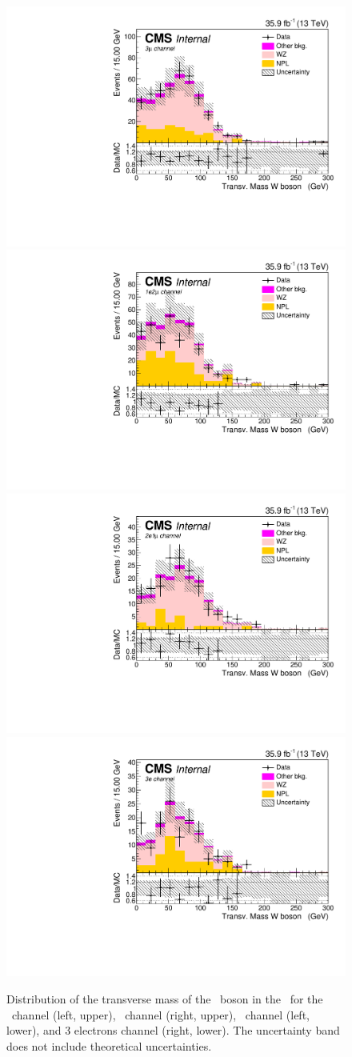 \begin{figure}[htbp]
	\centering
	\includegraphics[width=0.49\linewidth]{6_Search/Figures/InitialFit/wzcontrol_MVA_mWt_uuu_Stack}
	\includegraphics[width=0.49\linewidth]{6_Search/Figures/InitialFit/wzcontrol_MVA_mWt_uue_Stack}
	\includegraphics[width=0.49\linewidth]{6_Search/Figures/InitialFit/wzcontrol_MVA_mWt_eeu_Stack}
	\includegraphics[width=0.49\linewidth]{6_Search/Figures/InitialFit/wzcontrol_MVA_mWt_eee_Stack}
	\caption{Distribution of the transverse mass of the \PW\ boson in the \WZCR\ for the \mumumu\ channel (left, upper), \emumu\ channel (right, upper), \eemu\ channel (left, lower), and 3 electrons channel (right, lower). The uncertainty band does not include theoretical uncertainties.}
	\label{fig:mtwstack}
\end{figure}


